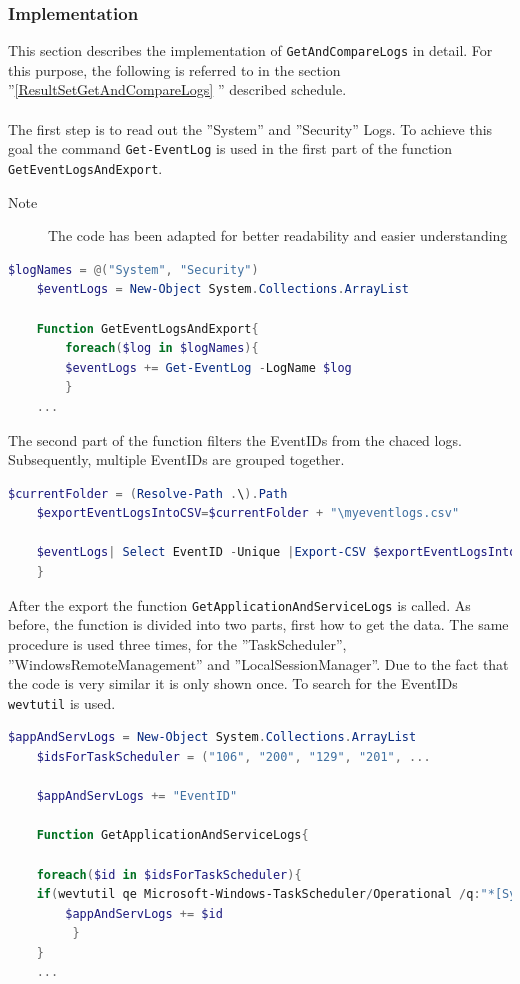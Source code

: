 \subsubsection{Implementation}
This section describes the implementation of \lstinline|GetAndCompareLogs| in detail. For this purpose, the following is referred to in the section ''\ref{ResultSetGetAndCompareLogs} '' described schedule.
\\\\
The first step is to read out the ''System'' and ''Security'' Logs. To achieve this goal the command \lstinline|Get-EventLog| is used in the first part of the function \lstinline|GetEventLogsAndExport|. \begin{description}
    \item[Note] The code has been adapted for better readability and easier understanding
    \end{description}
\begin{lstlisting}[caption=Function GetEventLogsAndExport Part 1, language=PowerShell]
    $logNames = @("System", "Security")
    $eventLogs = New-Object System.Collections.ArrayList

    Function GetEventLogsAndExport{
        foreach($log in $logNames){
        $eventLogs += Get-EventLog -LogName $log
        }
    ...
\end{lstlisting}
The second part of the function filters the EventIDs from the chaced logs. Subsequently, multiple EventIDs are grouped together.
\begin{lstlisting}[caption=Function GetEventLogsAndExport Part 2, language=PowerShell]
    $currentFolder = (Resolve-Path .\).Path
    $exportEventLogsIntoCSV=$currentFolder + "\myeventlogs.csv"

    $eventLogs| Select EventID -Unique |Export-CSV $exportEventLogsIntoCSV -NoTypeInfo -Encoding UTF8
    }
\end{lstlisting}
After the export the function \lstinline|GetApplicationAndServiceLogs| is called. As before, the function is divided into two parts, first how to get the data. The same procedure is used three times, for the ''TaskScheduler'', ''WindowsRemoteManagement'' and ''LocalSessionManager''. Due to the fact that the code is very similar it is only shown once. To search for the EventIDs  \lstinline|wevtutil| is used.
\begin{lstlisting}[caption=Function GetApplicationAndServiceLogs Part 1, language=PowerShell]
    $appAndServLogs = New-Object System.Collections.ArrayList
    $idsForTaskScheduler = ("106", "200", "129", "201", ...

    $appAndServLogs += "EventID"

    Function GetApplicationAndServiceLogs{
    
    foreach($id in $idsForTaskScheduler){
    if(wevtutil qe Microsoft-Windows-TaskScheduler/Operational /q:"*[System[(EventID="$id" )]]" /uni:false /f:text){
        $appAndServLogs += $id
         }
    }
    ...
\end{lstlisting}
